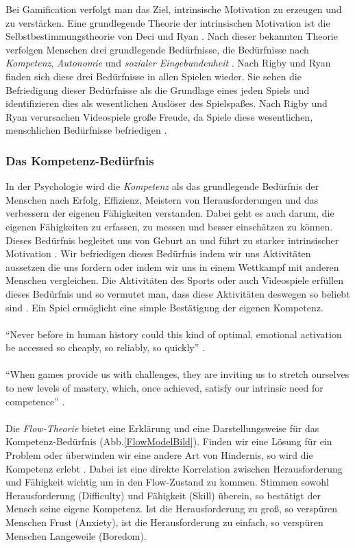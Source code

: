 \documentclass[a4paper,12pt]{scrartcl}
\begin{document}
Bei Gamification verfolgt man das Ziel, intrinsische Motivation zu erzeugen und zu verstärken. Eine grundlegende Theorie der intrinsischen Motivation ist die Selbstbestimmungstheorie von Deci und Ryan \cite{Ryan2000}. Nach dieser bekannten Theorie verfolgen Menschen drei grundlegende Bedürfnisse, die Bedürfnisse nach \textit{Kompetenz}, \textit{Autonomie} und \textit{sozialer Eingebundenheit} \cite{Rheinberg2006}. Nach Rigby und Ryan \cite{Rigby2011} finden sich diese drei Bedürfnisse in allen Spielen wieder. Sie sehen die Befriedigung dieser Bedürfnisse als die Grundlage eines jeden Spiels und identifizieren dies als wesentlichen Auslöser des Spielspaßes. Nach Rigby und Ryan verursachen Videospiele große Freude, da Spiele diese wesentlichen, menschlichen Bedürfnisse befriedigen \cite{Rigby2011}.

\subsubsection{Das Kompetenz-Bedürfnis}
In der Psychologie wird die \textit{Kompetenz} als das grundlegende Bedürfnis der Menschen nach Erfolg, Effizienz, Meistern von Herausforderungen und das verbessern der eigenen Fähigkeiten verstanden. Dabei geht es auch darum, die eigenen Fähigkeiten zu erfassen, zu messen und besser einschätzen zu können. Dieses Bedürfnis begleitet uns von Geburt an und führt zu starker intrinsischer Motivation \cite{Rigby2011}. Wir befriedigen dieses Bedürfnis indem wir uns Aktivitäten aussetzen die uns fordern oder indem wir uns in einem Wettkampf mit anderen Menschen vergleichen. Die Aktivitäten des Sports oder auch Videospiele erfüllen dieses Bedürfnis und so vermutet man, dass diese Aktivitäten deswegen so beliebt sind \cite{Mcgonigal2011}\cite{Rigby2011}\cite{Mayer2009}. Ein Spiel ermöglicht eine simple Bestätigung der eigenen Kompetenz.
\\\\
\enquote{Never before in human history could this kind of optimal, emotional activation be accessed so cheaply, so reliably, so quickly} \cite{Mcgonigal2011}.
\\\\
\enquote{When games provide us with challenges, they are inviting us to stretch ourselves to new levels of mastery, which, once achieved, satisfy our intrinsic need for competence} \cite{Rigby2011}. 
\\\\
Die \textit{Flow-Theorie} bietet eine Erklärung und eine Darstellungsweise für das Kompetenz-Bedürfnis (Abb.\ref{FlowModelBild}). Finden wir eine Lösung für ein Problem oder überwinden wir eine andere Art von Hindernis, so wird die Kompetenz erlebt \cite{Csikszentmihalyi2017}. Dabei ist eine direkte Korrelation zwischen Herausforderung und Fähigkeit wichtig um in den Flow-Zustand zu kommen. Stimmen sowohl Herausforderung (Difficulty) und Fähigkeit (Skill) überein, so bestätigt der Mensch seine eigene Kompetenz. Ist die Herausforderung zu groß, so verspüren Menschen Frust (Anxiety), ist die Herausforderung zu einfach, so verspüren Menschen Langeweile (Boredom).
\end{document}
